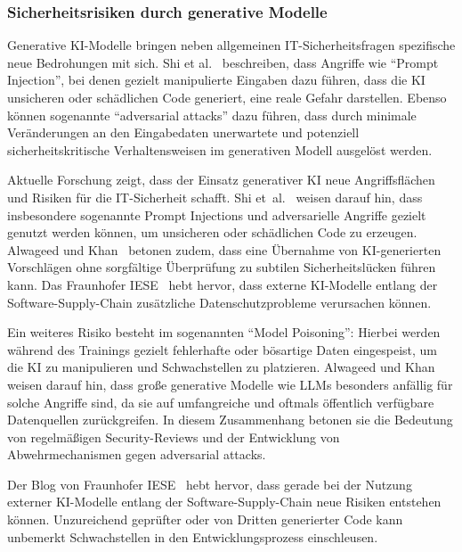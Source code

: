 \subsubsection{Sicherheitsrisiken durch generative Modelle}

Generative KI-Modelle bringen neben allgemeinen IT-Sicherheitsfragen
spezifische neue Bedrohungen mit sich. Shi et al.~\cite{shi_ai-assisted_2023}
beschreiben, dass Angriffe wie \enquote{Prompt Injection}, bei denen gezielt
manipulierte Eingaben dazu führen, dass die KI unsicheren oder schädlichen Code
generiert, eine reale Gefahr darstellen. Ebenso können sogenannte
\enquote{adversarial attacks} dazu führen, dass durch minimale Veränderungen an
den Eingabedaten unerwartete und potenziell sicherheitskritische
Verhaltensweisen im generativen Modell ausgelöst werden.

Aktuelle Forschung zeigt, dass der Einsatz generativer KI neue Angriffsflächen
und Risiken für die IT-Sicherheit schafft. Shi
et~al.~\cite{shi_ai-assisted_2023} weisen darauf hin, dass insbesondere
sogenannte Prompt Injections und adversarielle Angriffe gezielt genutzt werden
können, um unsicheren oder schädlichen Code zu erzeugen. Alwageed und
Khan~\cite{alwageed_role_nodate} betonen zudem, dass eine Übernahme von
KI-generierten Vorschlägen ohne sorgfältige Überprüfung zu subtilen
Sicherheitslücken führen kann. Das Fraunhofer
IESE~\cite{siebert_generative_2024} hebt hervor, dass externe KI-Modelle
entlang der Software-Supply-Chain zusätzliche Datenschutzprobleme verursachen
können.

Ein weiteres Risiko besteht im sogenannten \enquote{Model Poisoning}: Hierbei
werden während des Trainings gezielt fehlerhafte oder bösartige Daten
eingespeist, um die KI zu manipulieren und Schwachstellen zu platzieren.
Alwageed und Khan~\cite{alwageed_role_nodate} weisen darauf hin, dass große
generative Modelle wie LLMs besonders anfällig für solche Angriffe sind, da sie
auf umfangreiche und oftmals öffentlich verfügbare Datenquellen zurückgreifen.
In diesem Zusammenhang betonen sie die Bedeutung von regelmäßigen
Security-Reviews und der Entwicklung von Abwehrmechanismen gegen adversarial
attacks.

Der Blog von Fraunhofer IESE~\cite{siebert_generative_2024} hebt hervor, dass
gerade bei der Nutzung externer KI-Modelle entlang der Software-Supply-Chain
neue Risiken entstehen können. Unzureichend geprüfter oder von Dritten
generierter Code kann unbemerkt Schwachstellen in den Entwicklungsprozess
einschleusen.
